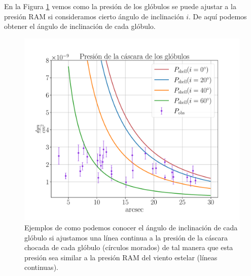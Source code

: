 \documentclass{book}
\begin{document}
En la Figura \ref{graf_presion_ang} vemos como la presión de los
glóbulos se puede ajustar a la presión RAM si consideramos cierto
ángulo de inclinación $i$. De aquí podemos obtener el ángulo de
inclinación de cada
glóbulo.

\begin{figure}[htb]
    \centering
    \includegraphics[width=\textwidth]{imagenes_corregidas/S_52.pdf}
    \caption{Ejemplos de como podemos conocer el ángulo de inclinación
      de cada glóbulo si ajustamos una línea continua a la presión de
      la cáscara chocada de cada glóbulo (círculos morados) de tal
      manera que esta presión sea similar a la presión RAM del viento
      estelar (líneas continuas).}
    \label{graf_presion_ang}
\end{figure}
\end{document}
